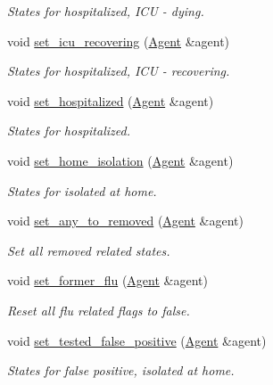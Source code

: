 \begin{DoxyCompactItemize}
\begin{DoxyCompactList}\small\item\em States for hospitalized, I\+CU -\/ dying. \end{DoxyCompactList}\item 
void \hyperlink{classStatesManager_a4c182f0f50b7f9355ef5799a5623a5d0}{set\+\_\+icu\+\_\+recovering} (\hyperlink{classAgent}{Agent} \&agent)
\begin{DoxyCompactList}\small\item\em States for hospitalized, I\+CU -\/ recovering. \end{DoxyCompactList}\item 
void \hyperlink{classStatesManager_a266757d7944ac2a13ec122e563fcfd0d}{set\+\_\+hospitalized} (\hyperlink{classAgent}{Agent} \&agent)
\begin{DoxyCompactList}\small\item\em States for hospitalized. \end{DoxyCompactList}\item 
void \hyperlink{classStatesManager_a5660eb874c13cabb0af244f8c6768685}{set\+\_\+home\+\_\+isolation} (\hyperlink{classAgent}{Agent} \&agent)
\begin{DoxyCompactList}\small\item\em States for isolated at home. \end{DoxyCompactList}\item 
void \hyperlink{classStatesManager_af64b9d50a965045094e39fb4a6e25864}{set\+\_\+any\+\_\+to\+\_\+removed} (\hyperlink{classAgent}{Agent} \&agent)
\begin{DoxyCompactList}\small\item\em Set all removed related states. \end{DoxyCompactList}\item 
void \hyperlink{classStatesManager_ad9059714401d4aaa66b88af987904e78}{set\+\_\+former\+\_\+flu} (\hyperlink{classAgent}{Agent} \&agent)
\begin{DoxyCompactList}\small\item\em Reset all flu related flags to false. \end{DoxyCompactList}\item 
void \hyperlink{classStatesManager_a6e3d21c4b60718d9d0c0ef6b43e6786e}{set\+\_\+tested\+\_\+false\+\_\+positive} (\hyperlink{classAgent}{Agent} \&agent)
\begin{DoxyCompactList}\small\item\em States for false positive, isolated at home. \end{DoxyCompactList}\item 

\end{DoxyCompactItemize}
